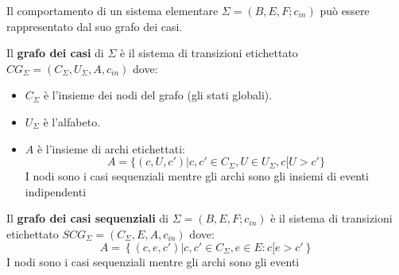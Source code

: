 Il comportamento di un sistema elementare $\Sigma = (B, E, F; c_{in})$ può essere
rappresentato dal suo grafo dei casi.
\begin{definizione}
    Il \textbf{grafo dei casi} di $\Sigma$ è il sistema di transizioni etichettato
    $CG_{\Sigma} = (C_{\Sigma},U_{\Sigma}, A, c_{in})$ dove:
    \begin{itemize}
        \item $C_{\Sigma}$ è l'insieme dei nodi del grafo (gli stati globali).
        \item $U_{\Sigma}$ è l'alfabeto.
        \item $A$ è l'insieme di archi etichettati:
              \begin{equation}
                  A = \{(c, U, c') | c, c' \in C_{\Sigma}, U \in U_{\Sigma}, c[U > c'\}
              \end{equation}
              I nodi sono i casi sequenziali mentre gli archi sono gli insiemi
              di eventi indipendenti
    \end{itemize}
\end{definizione}
\begin{definizione}
    Il \textbf{grafo dei casi sequenziali} di $\Sigma=(B,E,F;c_{in})$ è
    il sistema di transizioni etichettato $SCG_\Sigma=(C_\Sigma, E, A,c_{in})$
    dove:
    \begin{equation}
        A=\left\{(c,e,c')|c,c'\in C_\Sigma, e\in E: c[e>c' \right\}
    \end{equation}
    I nodi sono i casi sequenziali mentre gli archi sono gli eventi
\end{definizione}
